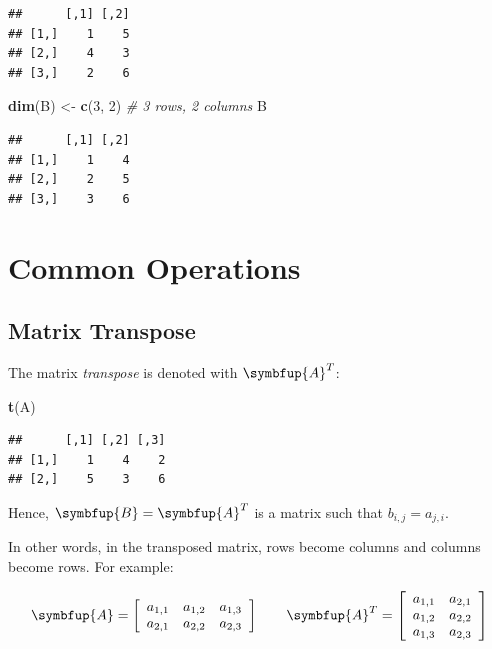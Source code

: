 \documentclass[10pt,b5paper,krantz1]{krantz}
\newenvironment{Shaded}{\begin{snugshade}}{\end{snugshade}}
\newcommand{\CommentTok}[1]{\textcolor[rgb]{0.37,0.37,0.37}{\textit{#1}}}
\newcommand{\DecValTok}[1]{\textcolor[rgb]{0.06,0.06,0.06}{#1}}
\newcommand{\KeywordTok}[1]{\textcolor[rgb]{0.27,0.27,0.27}{\textbf{#1}}}
\newcommand{\NormalTok}[1]{#1}
\newcommand{\StringTok}[1]{\textcolor[rgb]{0.5,0.5,0.5}{#1}}
\renewcommand{\mathbf}[1]{\symbfup{#1}}
\begin{document}
\begin{verbatim}
##      [,1] [,2]
## [1,]    1    5
## [2,]    4    3
## [3,]    2    6
\end{verbatim}

\begin{Shaded}
\begin{Highlighting}[]
\KeywordTok{dim}\NormalTok{(B) <-}\StringTok{ }\KeywordTok{c}\NormalTok{(}\DecValTok{3}\NormalTok{, }\DecValTok{2}\NormalTok{) }\CommentTok{# 3 rows, 2 columns}
\NormalTok{B}
\end{Highlighting}
\end{Shaded}

\begin{verbatim}
##      [,1] [,2]
## [1,]    1    4
## [2,]    2    5
## [3,]    3    6
\end{verbatim}

\hypertarget{common-operations-1}{%
\section{Common Operations}\label{common-operations-1}}

\hypertarget{matrix-transpose}{%
\subsection{Matrix Transpose}\label{matrix-transpose}}

The matrix \emph{transpose} is denoted with \(\mathbf{A}^T\):

\begin{Shaded}
\begin{Highlighting}[]
\KeywordTok{t}\NormalTok{(A)}
\end{Highlighting}
\end{Shaded}

\begin{verbatim}
##      [,1] [,2] [,3]
## [1,]    1    4    2
## [2,]    5    3    6
\end{verbatim}

Hence, \(\mathbf{B}=\mathbf{A}^T\) is a matrix such that \(b_{i,j}=a_{j,i}\).

In other words, in the transposed matrix, rows become columns and columns become rows.
For example:

\[
\mathbf{A}=
\left[
\begin{array}{ccc}
a_{1,1} & a_{1,2} & a_{1,3} \\
a_{2,1} & a_{2,2} & a_{2,3} \\
\end{array}
\right]
\qquad
\mathbf{A}^T=
\left[
\begin{array}{cc}
a_{1,1} & a_{2,1} \\
a_{1,2} & a_{2,2} \\
a_{1,3} & a_{2,3} \\
\end{array}
\right]
\]
\end{document}
